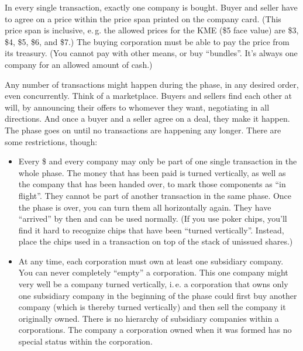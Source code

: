 \documentclass[10pt,final]{report}
\begin{document}
\begin{multicols}{2}
In every single transaction, exactly one company is bought. Buyer and
seller have to agree on a price within the price span printed on the
company card. (This price span is inclusive, e.\,g. the allowed prices
for the KME (\$5 face value) are \$3, \$4, \$5, \$6, and \$7.) The
buying corporation must be able to pay the price from its
treasury. (You cannot pay with other means, or buy ``bundles''. It's
always one company for an allowed amount of cash.)

Any number of transactions might happen during the phase, in any
desired order, even concurrently. Think of a marketplace. Buyers and
sellers find each other at will, by announcing their offers to
whomever they want, negotiating in all directions. And once a buyer
and a seller agree on a deal, they make it happen. The phase goes on
until no transactions are happening any longer. There are some
restrictions, though:
\begin{itemize}
\item Every \$ and every company may only be part of one single
  transaction in the whole phase. The money that has been paid is
  turned vertically, as well as the company that has been handed over,
  to mark those components as ``in flight''. They cannot be part of
  another transaction in the same phase. Once the phase is over, you
  can turn them all horizontally again. They have ``arrived'' by then
  and can be used normally. (If you use poker chips, you'll find it
  hard to recognize chips that have been ``turned
  vertically''. Instead, place the chips used in a transaction on top
  of the stack of unissued shares.)
\item At any time, each corporation must own at least one subsidiary
  company. You can never completely ``empty'' a corporation. This one
  company might very well be a company turned vertically, i.\,e. a
  corporation that owns only one subsidiary company in the beginning
  of the phase could first buy another company (which is thereby turned
  vertically) and then sell the company it originally owned. There is
  no hierarchy of subsidiary companies within a corporations. The
  company a corporation owned when it was formed has no special
  status within the corporation.
\end{itemize}


\end{multicols}
\end{document}
